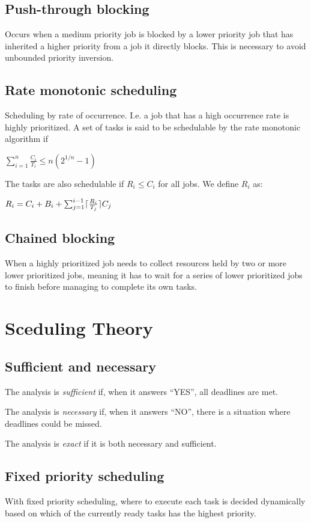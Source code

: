 \documentclass[a4paper]{article}
\DeclarePairedDelimiter{\ceil}{\lceil}{\rceil}
\begin{document}
\subsection{Push-through blocking}
Occurs when a medium priority job is blocked by a lower priority job that has
inherited a higher priority from a job it directly blocks. This is necessary
to avoid unbounded priority inversion.

\subsection{Rate monotonic scheduling}
Scheduling by rate of occurrence. I.e. a job that has a high occurrence rate is
highly prioritized. A set of tasks is said to be schedulable by the rate monotonic 
algorithm if 
\begin{center}
  $\sum_{i=1}^{n} \frac{C_i}{T_i} \leq n(2^{1/n}-1)$
\end{center}

The tasks are also schedulable if $R_i \leq C_i$ for all jobs. We define $R_i$ as:

\begin{center}
  $R_i = C_i + B_i + \sum_{j=1}^{i-1} \ceil{\frac{R_i}{T_j}}C_j$
\end{center}

\subsection{Chained blocking}
When a highly prioritized job needs to collect resources held by two or more
lower prioritized jobs, meaning it has to wait for a series of lower prioritized
jobs to finish before managing to complete its own tasks.

\section{Sceduling Theory}
\subsection{Sufficient and necessary}
The analysis is \emph{sufficient} if, when it answers ``YES'', all deadlines
are met.

The analysis is \emph{necessary} if, when it answers ``NO'', there is a
situation where deadlines could be missed.

The analysis is \emph{exact} if it is both necessary and sufficient.

\subsection{Fixed priority scheduling}
With fixed priority scheduling, where to execute each task is decided
dynamically based on which of the currently ready tasks has the highest
priority.
\end{document}
